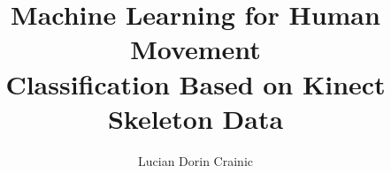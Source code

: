 \documentclass[binding=0.6cm]{sapthesis}
\title{Machine Learning for Human Movement \\ Classification Based on Kinect Skeleton Data}
\author{Lucian Dorin Crainic}
\begin{document}
\lstset{language=Python}

\frontmatter

\maketitle

\dedication{
    It does not matter how slowly you go as long as you do not stop. 
}


\cleardoublepage

\tableofcontents
\let\cleardoublepage\clearpage

\mainmatter













\backmatter
{}



\end{document}
